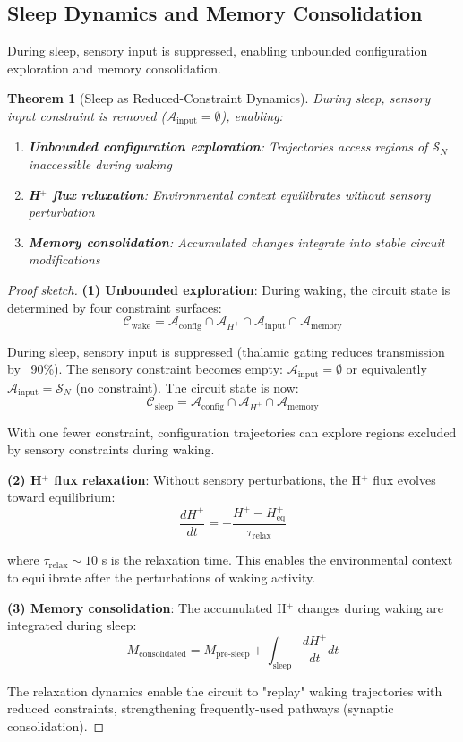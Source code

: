 \documentclass[aps,prd,twocolumn,superscriptaddress,floatfix,nofootinbib]{revtex4-2}
\newtheorem{theorem}{Theorem}[section]
\theoremstyle{remark}
\begin{document}
\subsection{Sleep Dynamics and Memory Consolidation}

During sleep, sensory input is suppressed, enabling unbounded configuration exploration and memory consolidation.

\begin{theorem}[Sleep as Reduced-Constraint Dynamics]
\label{thm:sleep_dynamics}
During sleep, sensory input constraint is removed ($\mathcal{A}_{\text{input}} = \emptyset$), enabling:
\begin{enumerate}
\item \textbf{Unbounded configuration exploration}: Trajectories access regions of $\mathcal{S}_N$ inaccessible during waking
\item \textbf{H$^+$ flux relaxation}: Environmental context equilibrates without sensory perturbation
\item \textbf{Memory consolidation}: Accumulated changes integrate into stable circuit modifications
\end{enumerate}
\end{theorem}

\begin{proof}[Proof sketch]
\textbf{(1) Unbounded exploration}: During waking, the circuit state is determined by four constraint surfaces:
$$
\mathcal{C}_{\text{wake}} = \mathcal{A}_{\text{config}} \cap \mathcal{A}_{H^+} \cap \mathcal{A}_{\text{input}} \cap \mathcal{A}_{\text{memory}}
$$

During sleep, sensory input is suppressed (thalamic gating reduces transmission by ~90\%). The sensory constraint becomes empty: $\mathcal{A}_{\text{input}} = \emptyset$ or equivalently $\mathcal{A}_{\text{input}} = \mathcal{S}_N$ (no constraint). The circuit state is now:
$$
\mathcal{C}_{\text{sleep}} = \mathcal{A}_{\text{config}} \cap \mathcal{A}_{H^+} \cap \mathcal{A}_{\text{memory}}
$$

With one fewer constraint, configuration trajectories can explore regions excluded by sensory constraints during waking.

\textbf{(2) H$^+$ flux relaxation}: Without sensory perturbations, the H$^+$ flux evolves toward equilibrium:
$$
\frac{dH^+}{dt} = -\frac{H^+ - H^+_{\text{eq}}}{\tau_{\text{relax}}}
$$

where $\tau_{\text{relax}} \sim 10$ s is the relaxation time. This enables the environmental context to equilibrate after the perturbations of waking activity.

\textbf{(3) Memory consolidation}: The accumulated H$^+$ changes during waking are integrated during sleep:
$$
M_{\text{consolidated}} = M_{\text{pre-sleep}} + \int_{\text{sleep}} \frac{dH^+}{dt} dt
$$

The relaxation dynamics enable the circuit to "replay" waking trajectories with reduced constraints, strengthening frequently-used pathways (synaptic consolidation).
\end{proof}
\end{document}
